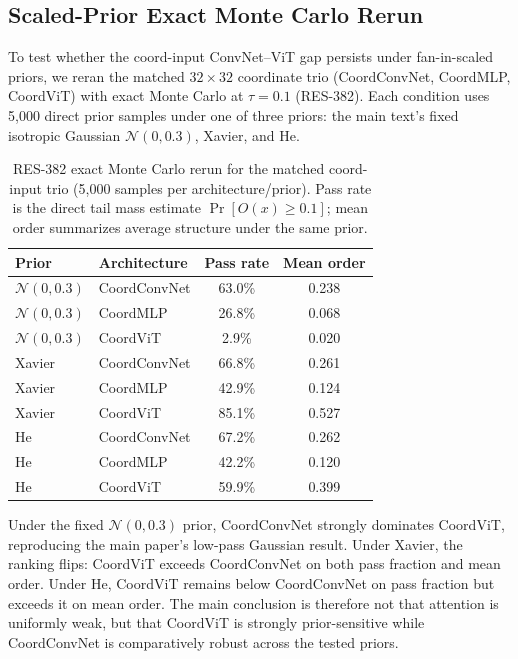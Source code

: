\subsection{Scaled-Prior Exact Monte Carlo Rerun}
\label{app:scaled_prior}

To test whether the coord-input ConvNet--ViT gap persists under fan-in-scaled priors, we reran the matched $32\times 32$ coordinate trio (CoordConvNet, CoordMLP, CoordViT) with exact Monte Carlo at $\tau=0.1$ (RES-382). Each condition uses 5,000 direct prior samples under one of three priors: the main text's fixed isotropic Gaussian $\mathcal{N}(0, 0.3)$, Xavier, and He.

\begin{table}[H]
\centering
\caption{RES-382 exact Monte Carlo rerun for the matched coord-input trio (5,000 samples per architecture/prior). Pass rate is the direct tail mass estimate $\Pr[O(x)\geq 0.1]$; mean order summarizes average structure under the same prior.}
\label{tab:scaled_prior_rerun}
\begin{tabular}{llcc}
\toprule
Prior & Architecture & Pass rate & Mean order \\
\midrule
\(\mathcal{N}(0,0.3)\) & CoordConvNet & 63.0\% & 0.238 \\
\(\mathcal{N}(0,0.3)\) & CoordMLP & 26.8\% & 0.068 \\
\(\mathcal{N}(0,0.3)\) & CoordViT & 2.9\% & 0.020 \\
\midrule
Xavier & CoordConvNet & 66.8\% & 0.261 \\
Xavier & CoordMLP & 42.9\% & 0.124 \\
Xavier & CoordViT & 85.1\% & 0.527 \\
\midrule
He & CoordConvNet & 67.2\% & 0.262 \\
He & CoordMLP & 42.2\% & 0.120 \\
He & CoordViT & 59.9\% & 0.399 \\
\bottomrule
\end{tabular}
\end{table}

Under the fixed $\mathcal{N}(0,0.3)$ prior, CoordConvNet strongly dominates CoordViT, reproducing the main paper's low-pass Gaussian result. Under Xavier, the ranking flips: CoordViT exceeds CoordConvNet on both pass fraction and mean order. Under He, CoordViT remains below CoordConvNet on pass fraction but exceeds it on mean order. The main conclusion is therefore not that attention is uniformly weak, but that CoordViT is strongly prior-sensitive while CoordConvNet is comparatively robust across the tested priors.

